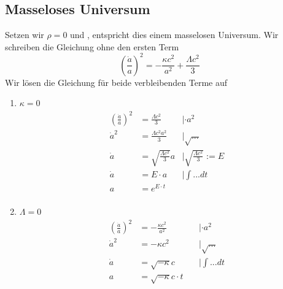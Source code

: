 \begin{refsection}
\subsection{Masseloses Universum}
Setzen wir $\rho = 0$ und , entspricht dies einem masselosen Universum.  Wir schreiben die Gleichung ohne den ersten Term
\[\left(\frac{\dot{a}}{a}\right) ^2 = - \frac{\kappa c^2}{a^2} + \frac{\Lambda c^2}{3}\]
Wir lösen die Gleichung für beide verbleibenden Terme auf
\begin{enumerate}
	\item $\kappa = 0$ 
		\begin{align*}
			\left(\frac{\dot{a}}{a}\right) ^2 &= \frac{\Lambda c^2}{3}  &| \cdot a^2 \\
			\dot{a} ^2 &= \frac{\Lambda c^2 a^2}{3}  &|\sqrt{...}\\
			\dot{a} &= \sqrt{\frac{\Lambda c^2}{3}} a &|\sqrt{\frac{\Lambda c^2}{3}} := E\\
			\dot{a} &= E \cdot a &|\int ... dt \\
			a &= e^{E \cdot t}  \\
		\end{align*}
		
	\item $\Lambda = 0$ 
		\begin{align*}
			\left(\frac{\dot{a}}{a}\right) ^2 &= - \frac{\kappa c^2}{a^2}  \qquad &| \cdot a^2\\
			\dot{a} ^2 &= - \kappa c^2 \qquad &|\sqrt{...}\\
			\dot{a} &= \sqrt{- \kappa} c \qquad &|\int ... dt\\
			a &= \sqrt{- \kappa} c \cdot t  \\
		\end{align*}
\end{enumerate}


\end{refsection}

